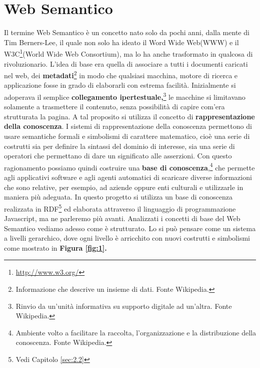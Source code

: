 \documentclass[a4paper,11pt]{article}
\begin{document}
\section{Web Semantico}
\label{sec:2}
Il termine Web Semantico è un concetto nato solo da pochi anni, dalla mente di Tim Berners-Lee, il quale non solo ha ideato il Word Wide Web(WWW) e il W3C\footnote{\url{http://www.w3.org/}}(World Wide Web Consortium), ma lo ha anche trasformato in qualcosa di rivoluzionario. L'idea di base era quella di associare a tutti i documenti caricati nel web, dei \textbf{metadati}\footnote{Informazione che descrive un insieme di dati. Fonte Wikipedia.} in modo che qualsiasi macchina, motore di ricerca e applicazione fosse in grado di elaborarli con estrema facilità.\newline
Inizialmente si adoperava il semplice \textbf{collegamento ipertestuale,}\footnote{Rinvio da un'unità informativa su supporto digitale ad un'altra. Fonte Wikipedia.} le macchine si limitavano solamente a trasmettere il contenuto, senza possibilità di capire com'era strutturata la pagina.
A tal proposito si utilizza il concetto di \textbf{rappresentazione della conoscenza}.
I sistemi di rappresentazione della conoscenza permettono di usare semantiche formali e simbolismi di carattere matematico, cioè una serie di costrutti sia per definire la sintassi del dominio di interesse, sia una serie di operatori che permettano di dare un significato alle asserzioni.
Con questo ragionamento possiamo quindi costruire una \textbf{base di conoscenza},\footnote{Ambiente volto a facilitare la raccolta, l'organizzazione e la distribuzione della conoscenza. Fonte Wikipedia.} che permette agli applicativi software e agli agenti automatici di scaricare diverse informazioni che sono relative, per esempio, ad aziende oppure enti culturali e utilizzarle in maniera più adeguata. In questo progetto si utilizza un base di conoscenza realizzata in RDF\footnote{Vedi Capitolo \ref{sec:2.2}} ed elaborata attraverso il linguaggio di programmazione Javascript, ma ne parleremo più avanti.\newline
Analizzati i concetti di base del Web Semantico vediamo adesso come è strutturato. Lo si può pensare come un sistema a livelli gerarchico, dove ogni livello è arricchito con nuovi costrutti e simbolismi come mostrato in \textbf{Figura \ref{fig:1}.}
\end{document}

